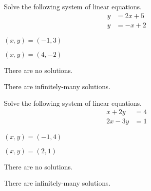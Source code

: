 \begin{readinessAssuranceTest}
\item Solve the following system of linear equations.
      \begin{align*}
      y   &=   2x+5 \\
      y  &=  -x+2
      \end{align*}

\begin{multicols}{4}
\begin{readinessAssuranceTestChoices}
\item \((x,y)=(-1,3)\)
\item \((x,y)=(4,-2)\)
\item There are no solutions.
\item There are infinitely-many solutions.
\end{readinessAssuranceTestChoices}
\end{multicols}

\item Solve the following system of linear equations.
      \begin{align*}
      x+2y   &=   4 \\
      2x-3y  &=  1
      \end{align*}

\begin{multicols}{4}
\begin{readinessAssuranceTestChoices}
\item \((x,y)=(-1,4)\)
\item \((x,y)=(2,1)\)
\item There are no solutions.
\item There are infinitely-many solutions.
\end{readinessAssuranceTestChoices}
\end{multicols}

\end{readinessAssuranceTest}
